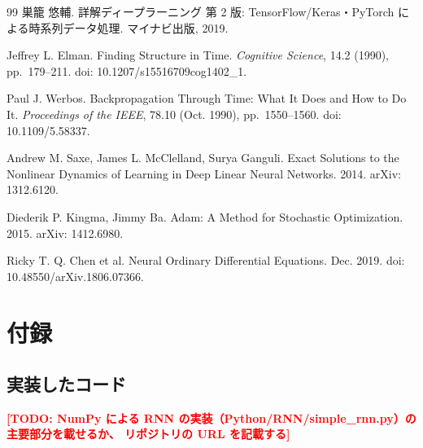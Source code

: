 \documentclass[a4paper,11pt,openany]{ltjsreport}
\newcommand{\TODO}[1]{\textcolor{red}{\textbf{[TODO: #1]}}}
\begin{document}
\begin{thebibliography}{99}
巣籠 悠輔.
\newblock 詳解ディープラーニング 第 2 版: TensorFlow/Keras・PyTorch による時系列データ処理.
\newblock マイナビ出版, 2019.

Jeffrey L. Elman.
\newblock Finding Structure in Time.
\newblock \textit{Cognitive Science}, 14.2 (1990), pp.~179--211.
\newblock doi: 10.1207/s15516709cog1402\_1.

Paul J. Werbos.
\newblock Backpropagation Through Time: What It Does and How to Do It.
\newblock \textit{Proceedings of the IEEE}, 78.10 (Oct. 1990), pp.~1550--1560.
\newblock doi: 10.1109/5.58337.

Andrew M. Saxe, James L. McClelland, Surya Ganguli.
\newblock Exact Solutions to the Nonlinear Dynamics of Learning in Deep Linear
Neural Networks. 2014.
\newblock arXiv: 1312.6120.

Diederik P. Kingma, Jimmy Ba.
\newblock Adam: A Method for Stochastic Optimization. 2015.
\newblock arXiv: 1412.6980.

Ricky T. Q. Chen et al.
\newblock Neural Ordinary Differential Equations. Dec. 2019.
\newblock doi: 10.48550/arXiv.1806.07366.

\end{thebibliography}

\appendix
\chapter{付録}

\section{実装したコード}

\TODO{NumPy による RNN の実装（Python/RNN/simple\_rnn.py）の主要部分を載せるか、
      リポジトリの URL を記載する}
\end{document}

